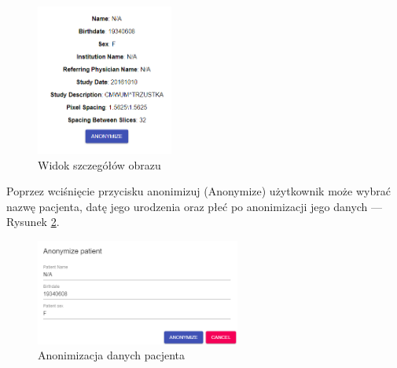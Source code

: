 \documentclass[a4paper,11pt,twoside,openright]{report}
\theoremstyle{definition}
\begin{document}
\begin{enumerate}
\begin{figure}[h!]
	\center
	\includegraphics[width=0.4\textwidth]{18}
	\caption{Widok szczegółów obrazu}
    	\label{fig:18}
\end{figure}

Poprzez wciśnięcie przycisku anonimizuj (Anonymize) użytkownik może wybrać nazwę
pacjenta, datę jego urodzenia oraz płeć po anonimizacji jego danych --- Rysunek \ref{fig:19}.

\begin{figure}[h!]
	\center
	\includegraphics[width=0.6\textwidth]{19}
	\caption{Anonimizacja danych pacjenta}
    	\label{fig:19}
\end{figure}



\end{enumerate}
\end{document}
